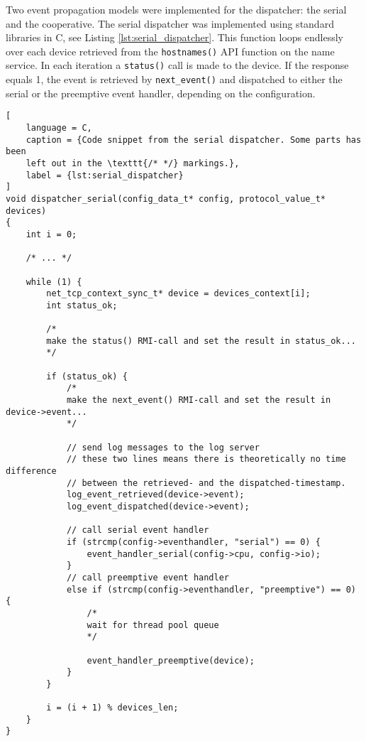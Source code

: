 Two event propagation models were implemented for the dispatcher: the serial
and the cooperative. The serial dispatcher was implemented using standard
libraries in C, see Listing \ref{lst:serial_dispatcher}. This function loops
endlessly over each device retrieved from the \texttt{hostnames()} API function
on the name service. In each iteration a \texttt{status()} call is made to the
device. If the response equals 1, the event is retrieved by
\texttt{next\_event()} and dispatched to either the serial or the preemptive
event handler, depending on the configuration.

\begin{lstlisting}[
    language = C,
    caption = {Code snippet from the serial dispatcher. Some parts has been
    left out in the \texttt{/* */} markings.},
    label = {lst:serial_dispatcher}
]
void dispatcher_serial(config_data_t* config, protocol_value_t* devices)
{
    int i = 0;

    /* ... */

    while (1) {
        net_tcp_context_sync_t* device = devices_context[i];
        int status_ok;

        /*
        make the status() RMI-call and set the result in status_ok...
        */

        if (status_ok) {
            /*
            make the next_event() RMI-call and set the result in device->event...
            */

            // send log messages to the log server
            // these two lines means there is theoretically no time difference
            // between the retrieved- and the dispatched-timestamp.
            log_event_retrieved(device->event);
            log_event_dispatched(device->event);

            // call serial event handler
            if (strcmp(config->eventhandler, "serial") == 0) {
                event_handler_serial(config->cpu, config->io);
            }
            // call preemptive event handler
            else if (strcmp(config->eventhandler, "preemptive") == 0) {
                /*
                wait for thread pool queue
                */

                event_handler_preemptive(device);
            }
        }

        i = (i + 1) % devices_len;
    }
}
\end{lstlisting}

